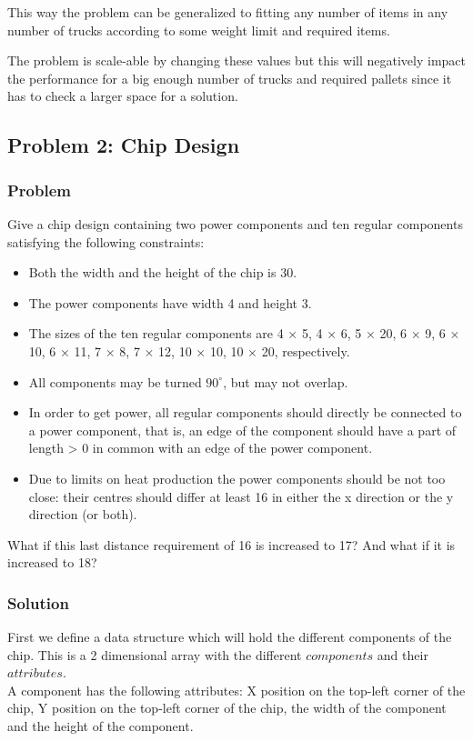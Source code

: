 \documentclass[12pt]{article}
\begin{document}
This way the problem can be generalized to fitting any number of items in any number of trucks according to some weight limit and required items.

The problem is scale-able by changing these values but this will negatively impact the performance for a big enough number of trucks and required pallets since it has to check a larger space for a solution.

\subsection*{Problem 2: Chip Design}

\subsubsection*{Problem}

Give a chip design containing two power components and ten regular components satisfying the following constraints:\\
\begin{itemize}
    \item Both the width and the height of the chip is 30.
    \item The power components have width 4 and height 3.
    \item The sizes of the ten regular components are 4 × 5, 4 × 6, 5 × 20, 6 × 9, 6 × 10, 6 × 11, 7 × 8, 7 × 12, 10 × 10, 10 × 20, respectively.
    \item All components may be turned $90^\circ$, but may not overlap.
    \item In order to get power, all regular components should directly be connected to a power component, that is, an edge of the component should have a part of length > 0 in common with an edge of the power component.
    \item Due to limits on heat production the power components should be not too close: their centres should differ at least 16 in either the x direction or the y direction (or both).
\end{itemize}

What if this last distance requirement of 16 is increased to 17? And what if it is increased to 18?

\subsubsection*{Solution}

First we define a data structure which will hold the different components of the chip. This is a 2 dimensional array with the different $components$ and their $attributes$.\\
A component has the following attributes: X position on the top-left corner of the chip, Y position on the top-left corner of the chip, the width of the component and the height of the component.\\
\end{document}
